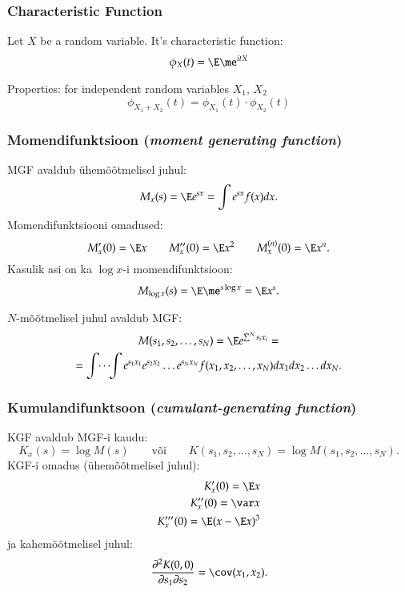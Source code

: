 \documentclass[a4paper]{article}
\numberwithin{equation}{subsection}
\begin{document}
\subsubsection{Characteristic  Function}
\label{sec:characteristic_function}

Let $X$ be a random variable.  It's characteristic function:
\begin{equation}
  \label{eq:characteristic_function}
  \phi_{X}(t) = \E \me^{itX}
\end{equation}

Properties: for independent random variables $X_{1}$, $X_{2}$
\begin{equation}
  \phi_{X_{1} + X_{2}}(t) = \phi_{X_{1}}(t) \cdot \phi_{X_{2}}(t)
\end{equation}

\subsubsection{Momendifunktsioon (\emph{moment generating function})}

MGF avaldub ühemõõtmelisel juhul:
\begin{equation}
M_x (s) = \E e^{sx} = \int e^{sx} f(x) dx.
\end{equation}
Momendifunktsiooni omadused:
\begin{equation}
M_x'(0) = \E x \qquad M_x''(0) = \E x^2 \qquad 
  M_x^{(n)}(0) = \E x^n.
\end{equation}
Kasulik asi on ka $\log x$-i momendifunktsioon:
\begin{equation}
M_{\log x}(s) = \E \me^{s \log x} = \E x^s.
\end{equation}

$N$-mõõtmelisel juhul avaldub MGF:
\begin{multline}
M( s_1,s_2,\ldots,s_N) = \E e^{\sum^N s_i x_i} = \\
= \idotsint e^{s_1 x_1}
  e^{s_2 x_2} \ldots e^{s_N x_N} f(x_1,x_2,\ldots, x_N) dx_1 dx_2 \ldots
  dx_N. 
\end{multline}

\subsubsection{Kumulandifunktsoon (\emph{cumulant-generating function})}

KGF avaldub MGF-i kaudu:
\begin{equation}
K_x(s) = \log M(s) 
  \qquad \mbox{või} \qquad
K(s_1,s_2,\ldots,s_N) = \log M( s_1,s_2,\ldots,s_N).
\end{equation}
KGF-i omadus (ühemõõtmelisel juhul):
\begin{eqnarray}
K_x'(0) = \E x \\
K_x''(0) = \var x\\
K_x'''(0) = \E(x-\E x)^3
\end{eqnarray}
ja kahemõõtmelisel juhul:
\begin{equation}
\frac{\partial^2 K(0,0)}{\partial s_1 \partial s_2} =
  \cov( x_1, x_2).
\end{equation}
\end{document}
